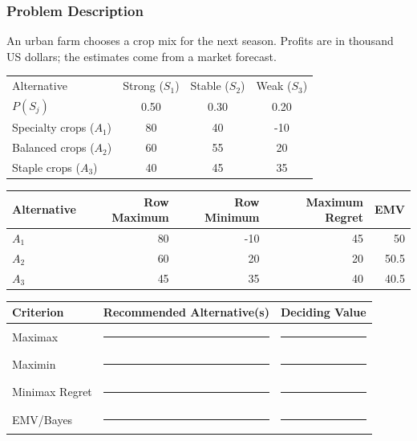 \subsubsection*{Problem Description}
An urban farm chooses a crop mix for the next season. Profits are in thousand US dollars; the estimates come from a market forecast.

\begin{center}
	\begin{tabular}{lccc}\toprule
		Alternative & Strong ($S_1$) & Stable ($S_2$) & Weak ($S_3$)\\
		$P(S_j)$ & 0.50 & 0.30 & 0.20\\\midrule
		Specialty crops ($A_1$) & 80 & 40 & -10\\
		Balanced crops ($A_2$) & 60 & 55 & 20\\
		Staple crops ($A_3$) & 40 & 45 & 35\\\bottomrule
	\end{tabular}
\end{center}

\begin{center}
	\begin{tabular}{lrrrr}\toprule
		Alternative & Row Maximum & Row Minimum & Maximum Regret & EMV\\\midrule
		$A_1$ & 80 & -10 & 45 & 50\\
		$A_2$ & 60 & 20 & 20 & 50.5\\
		$A_3$ & 45 & 35 & 40 & 40.5\\\bottomrule
	\end{tabular}
\end{center}

\begin{center}
	\begin{tabular}{lll}\toprule
		Criterion & Recommended Alternative(s) & Deciding Value\\\midrule
		Maximax & \rule{3cm}{0.4pt} & \rule{2cm}{0.4pt}\\
		Maximin & \rule{3cm}{0.4pt} & \rule{2cm}{0.4pt}\\
		Minimax Regret & \rule{3cm}{0.4pt} & \rule{2cm}{0.4pt}\\
		EMV/Bayes & \rule{3cm}{0.4pt} & \rule{2cm}{0.4pt}\\\bottomrule
	\end{tabular}
\end{center}


